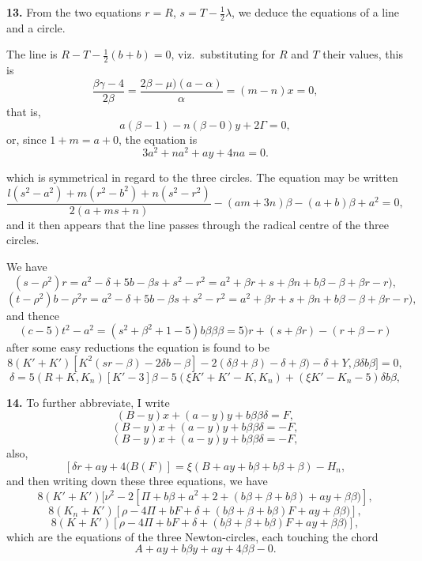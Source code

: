 \documentclass[11pt,a4paper]{book}
\begin{document}
\textbf{13.} From the two equations $r = R$, $s = T - \frac{1}{2}\lambda$, we deduce the equations of a line and a circle.

The line is $R - T - \frac{1}{2}(b + b) = 0$, viz.\ substituting for $R$ and $T$ their values, this is
\[
\frac{\beta\gamma - 4}{2\beta} = \frac{2\beta - \mu)(a - \alpha)}{\alpha} = (m - n)x = 0,
\]
that is,
\[
a (\beta - 1) - n(\beta - 0)y + 2\Gamma = 0,
\]
or, since $1 + m = a + 0$, the equation is
\[
3a^2 + na^2 + a y + 4na = 0.
\]

which is symmetrical in regard to the three circles. The equation may be written
\[
\frac{l(s^2 - a^2) + m(r^2 - b^2) + n(s^2 - r^2)}{2(a + ms + n)} - (am + 3n)\beta - (a + b)\beta + a^2 = 0,
\]
and it then appears that the line passes through the radical centre of the three circles.

We have
\[
(s - \rho^2)r = a^2 - \delta + 5b - \beta s + s^2 - r^2 = a^2 + \beta r + s + \beta n + b\beta - \beta + \beta r - r) ,
\]
\[
(t - \rho^2)b - \rho^2 r = a^2 - \delta + 5b - \beta s + s^2 - r^2 = a^2 + \beta r + s + \beta n + b\beta - \beta + \beta r - r) ,
\]
and thence
\[
(c - 5)t^2 - a^2 = (s^2 + \beta^2 + 1 - 5)b\beta\beta\beta = 5)r + (s + \beta r) - (r + \beta - r)
\]
after some easy reductions the equation is found to be
\[
8(K' + K')[K^2 (sr - \beta) - 2\delta b - \beta] - 2(\delta\beta + \beta) - \delta + \beta) - \delta + Y, \beta\delta b\beta] = 0,
\]
\[
\delta = 5(R + K, K_n)[K' - 3]\beta - 5(\xi K' + K' - K, K_n) + (\xi K' - K_n - 5)\delta b\beta,
\]

\textbf{14.} To further abbreviate, I write
\[
(B - y)x + (a - y)y + b\beta\beta\delta = F,
\]
\[
(B - y)x + (a - y)y + b\beta\beta\delta = - F,
\]
\[
(B - y)x + (a - y)y + b\beta\beta\delta = - F,
\]
also,
\[
[\delta r + a y + 4(B(F)] = \xi(B + a y + b\beta + b\beta + \beta) - H_n,
\]
and then writing down these three equations, we have
\[
8(K' + K')[\nu^2 - 2[\Pi + b\beta + a^2 + 2 + (b\beta + \beta + b\beta) + a y + \beta\beta)],
\]
\[
8(K_n + K')[\rho - 4\Pi + bF + \delta + (b\beta + \beta + b\beta)F + a y + \beta\beta)],
\]
\[
8(K + K')[\rho - 4\Pi + bF + \delta + (b\beta + \beta + b\beta)F + a y + \beta\beta)],
\]
which are the equations of the three Newton-circles, each touching the chord
\[
A + a y + b\beta y + a y + 4\beta\beta - 0.
\]
\end{document}
